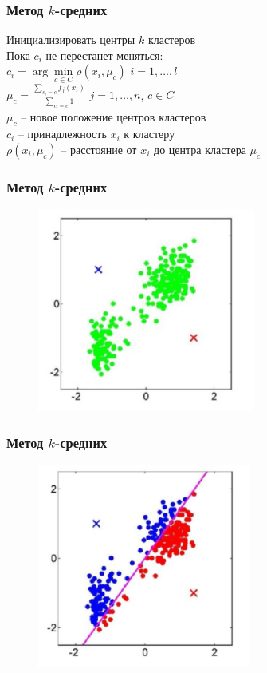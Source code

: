 \documentclass[12pt]{beamer}
\begin{document}
\begin{frame}\frametitle{Метод $k$-средних}
Инициализировать центры $k$ кластеров \\
\vspace{2mm}
Пока $c_i$ не перестанет меняться:\\
\hspace{5mm} $c_i = \arg\min\limits_{c \in C} \rho(x_i, \mu_c)$ \hspace{5mm} $i = 1,\dots, l$\\
\vspace{2mm}\hspace{5mm} ${\mu_c = \frac{\sum\limits_{c_i = c} f_j(x_i)}{\sum\limits_{c_i = c} 1} }$ \hspace{10mm} $j = 1,\dots, n$, $c \in C$\\
\vspace{2mm}
$\mu_c$ -- новое положение центров кластеров\\
$c_i$ -- принадлежность $x_i$ к кластеру\\
$\rho(x_i, \mu_c)$ -- расстояние от $x_i$ до центра кластера $\mu_c$
\end{frame}

\begin{frame}\frametitle{Метод $k$-средних}
\begin{figure}[htbp]
  \includegraphics[height=190pt, keepaspectratio = true]{images/k-means-1}   
\end{figure}
\end{frame}

\begin{frame}\frametitle{Метод $k$-средних}
\begin{figure}[htbp]
  \includegraphics[height=190pt, keepaspectratio = true]{images/k-means-2}   
\end{figure}
\end{frame}
\end{document}

